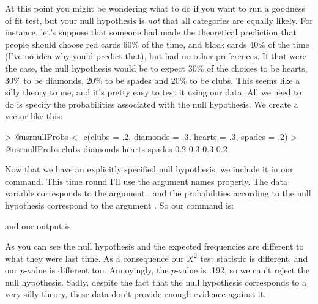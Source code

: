 At this point you might be wondering what to do if you want to run a goodness of fit test, but your null hypothesis is {\it not} that all categories are equally likely. For instance, let's suppose that someone had made the theoretical prediction that people should choose red cards 60\% of the time, and black cards 40\% of the time (I've no idea why you'd predict that), but had no other preferences. If that were the case, the null hypothesis would be to expect 30\% of the choices to be hearts, 30\% to be diamonds, 20\% to be spades and 20\% to be clubs. This seems like a silly theory to me, and it's pretty easy to test it using our data. All we need to do is specify the probabilities associated with the null hypothesis. We create a vector like this:
\begin{rblock1}
> @usr{nullProbs <- c(clubs = .2, diamonds = .3, hearts = .3, spades = .2)}
> @usr{nullProbs}
   clubs diamonds   hearts   spades 
     0.2      0.3      0.3      0.2 
\end{rblock1}
Now that we have an explicitly specified null hypothesis, we include it in our command. This time round I'll use the argument names properly. The data variable corresponds to the argument , and the probabilities according to the null hypothesis correspond to the argument . So our command is:
and our output is:
As you can see the null hypothesis and the expected frequencies are different to what they were last time. As a consequence our $X^2$ test statistic is different, and our $p$-value is different too. Annoyingly, the $p$-value is .192, so we can't reject the null hypothesis. Sadly, despite the fact that the null hypothesis corresponds to a very silly theory, these data don't provide enough evidence against it.



